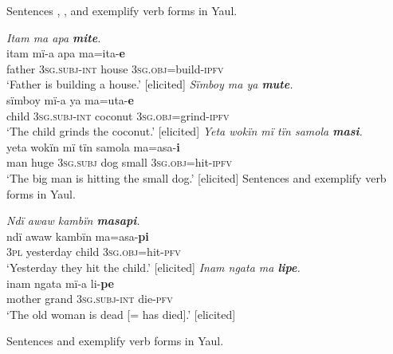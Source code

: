   Sentences , , and  exemplify  verb forms in Yaul.

\ea%
    \label{ex:mdy:3}
            \textit{Itam ma apa \textbf{mite}.}\\
    \gll itam  mï{}-a      apa    ma=ita-\textbf{e}\\
    father  3\textsc{sg.subj-int}  house  3\textsc{sg.obj}=build-\textsc{ipfv}\\
    \glt ‘Father is building a house.’ [elicited]
\z
\ea%
    \label{ex:mdy:4}
            \textit{Sïmboy ma ya \textbf{mute}.}\\
    \gll sïmboy  mï-a      ya      ma=uta-\textbf{e}\\
    child  3\textsc{sg.subj-int}  coconut  3\textsc{sg.obj}=grind-\textsc{ipfv}\\
    \glt ‘The child grinds the coconut.’ [elicited]
\z
\ea%
    \label{ex:mdy:5}
            \textit{Yeta wokïn mï tïn samola \textbf{masi}.}\\
    \gll yeta  wokïn  mï       tïn    samola  ma=asa-\textbf{i}\\
    man  huge    3\textsc{sg.subj}  dog  small  3\textsc{sg.obj}=hit-\textsc{ipfv}\\
    \glt ‘The big man is hitting the small dog.’ [elicited]
\z
Sentences  and  exemplify  verb forms in Yaul.

\ea%
    \label{ex:mdy:6}
            \textit{Ndï awaw kambïn \textbf{masapi}.}\\
    \gll ndï  awaw    kambïn  ma=asa-\textbf{pi}\\
    3\textsc{pl}  yesterday  child    3\textsc{sg.obj}=hit-\textsc{pfv}\\
    \glt ‘Yesterday they hit the child.’ [elicited]
\z
\ea%
    \label{ex:mdy:7}
            \textit{Inam ngata ma \textbf{lipe}.}\\
    \gll inam  ngata  mï-a      li-\textbf{pe}\\
    mother  grand  3\textsc{sg.subj}{}-\textsc{int}  die-\textsc{pfv}\\
    \glt ‘The old woman is dead [= has died].’ [elicited]
\z

Sentences  and  exemplify  verb forms in Yaul.

